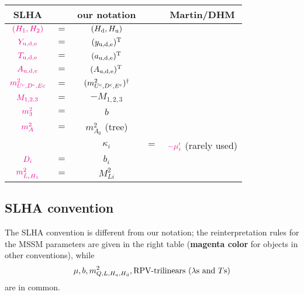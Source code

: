 \documentclass[CheatSheet]{subfiles}
\begin{document}
\newpage
\begin{wraptable}{r}{200pt}\vspace{-3em}
 \begin{tabular}[t]{c@{\,}c@{\,}c@{\,}c@{\,}c}\toprule
 SLHA  && our notation && Martin/DHM\\\midrule
 $\color{magenta}(H_1, H_2)$              &$=$& $(H_{\mathrm{d}}, H_{\mathrm{u}})$ \\\midrule
 $\color{magenta}Y_{\mathrm{u,d,e}}$      &$=$& $(y_{\mathrm{u,d,e}})^{\mathrm{T}}$\\
 $\color{magenta}T_{\mathrm{u,d,e}}$      &$=$& $(a_{\mathrm{u,d,e}})^{\mathrm{T}}$\\
 $\color{magenta}A_{\mathrm{u,d,e}}$      &$=$& $(A_{\mathrm{u,d,e}})^{\mathrm{T}}$\\
 $\color{magenta}m^2_{U^{\mathrm{c}},D^{\mathrm{c}}, E\mathrm{c}}$ &$=$& $(m^2_{U^{\mathrm{c}},D^{\mathrm{c}}, E^{\mathrm{c}}})^\dagger$\\
 $\color{magenta}M_{1,2,3}$               &$=$& $-M_{1,2,3}$\\
 $\color{magenta}m_3^2$                   &$=$& $b$\\
 $\color{magenta}m_A^2$                   &$=$& $m^2_{A_0}$ (tree)\\\midrule
                           &&$\kappa_i$ &$=$& $\color{magenta}-\mu_i'$ \footnotesize{(rarely used)}\\
 $\color{magenta}D_i$                     &$=$& $b_i$\\
 $\color{magenta}m^2_{\tilde L_iH_1}$     &$=$& $M^2_{Li}$ \\\bottomrule
 \end{tabular}
\end{wraptable}

\subsection{SLHA convention}
The SLHA convention \cite{SLHA} is different from our notation; the reinterpretation rules for the MSSM parameters are given in the right table  (\textbf{\col magenta color} for objects in other conventions), while
\begin{equation*}
  \mu, b, m^2_{Q, L, H_{\mathrm{u}}, H_{\mathrm{d}}}, \text{RPV-trilinears ($\lambda$s and $T$s)}
\end{equation*}
 are in common.



\clearpage
\end{document}
